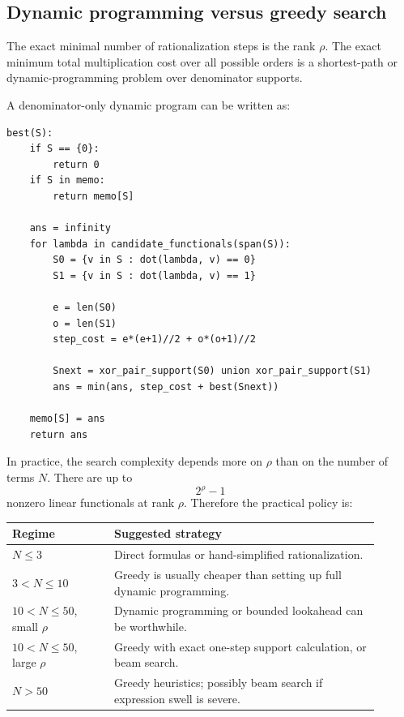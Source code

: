 \documentclass[11pt]{article}
\begin{document}
\subsection{Dynamic programming versus greedy search}

The exact minimal number of rationalization steps is the rank \(\rho\). The exact minimum total multiplication cost over all possible orders is a shortest-path or dynamic-programming problem over denominator supports.

A denominator-only dynamic program can be written as:
\begin{lstlisting}
best(S):
    if S == {0}:
        return 0
    if S in memo:
        return memo[S]

    ans = infinity
    for lambda in candidate_functionals(span(S)):
        S0 = {v in S : dot(lambda, v) == 0}
        S1 = {v in S : dot(lambda, v) == 1}

        e = len(S0)
        o = len(S1)
        step_cost = e*(e+1)//2 + o*(o+1)//2

        Snext = xor_pair_support(S0) union xor_pair_support(S1)
        ans = min(ans, step_cost + best(Snext))

    memo[S] = ans
    return ans
\end{lstlisting}

In practice, the search complexity depends more on \(\rho\) than on the number of terms \(N\). There are up to
\begin{equation}
  2^\rho-1
\end{equation}
nonzero linear functionals at rank \(\rho\). Therefore the practical policy is:

\begin{center}
\begin{tabular}{>{\raggedright\arraybackslash}p{0.25\linewidth} >{\raggedright\arraybackslash}p{0.65\linewidth}}
\toprule
Regime & Suggested strategy \\
\midrule
\(N\leq 3\) & Direct formulas or hand-simplified rationalization. \\
\(3<N\leq 10\) & Greedy is usually cheaper than setting up full dynamic programming. \\
\(10<N\leq 50\), small \(\rho\) & Dynamic programming or bounded lookahead can be worthwhile. \\
\(10<N\leq 50\), large \(\rho\) & Greedy with exact one-step support calculation, or beam search. \\
\(N>50\) & Greedy heuristics; possibly beam search if expression swell is severe. \\
\bottomrule
\end{tabular}
\end{center}
\end{document}
